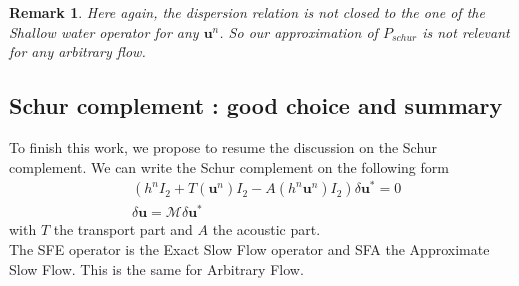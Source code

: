 \documentclass[a4paper, 11pt]{report}
\newtheorem{Remark}{Remark}
\begin{document}
\begin{Remark}
Here again, the dispersion relation is not closed to the one of the Shallow water operator for any $\boldsymbol{u}^n$. So our approximation of $P_{schur}$ is not relevant for any arbitrary flow.
\end{Remark}




\subsection{Schur complement : good choice and summary}
To finish this work, we propose to resume the discussion on the Schur complement.
We can write the Schur complement on the following form
\begin{align*}
&\left(h^n I_2 + T(\boldsymbol{u}^n) I_2 - A(h^n\boldsymbol{u}^n)I_2\right)\delta \boldsymbol{u}^* =0\\
&\delta \boldsymbol{u} = \mathcal{M} \delta \boldsymbol{u}^*
\end{align*}
with $T$ the transport part and $A$ the acoustic part.\\
The SFE operator is the Exact Slow Flow operator and SFA the Approximate Slow Flow. This is the same for Arbitrary Flow.\\
\end{document}
